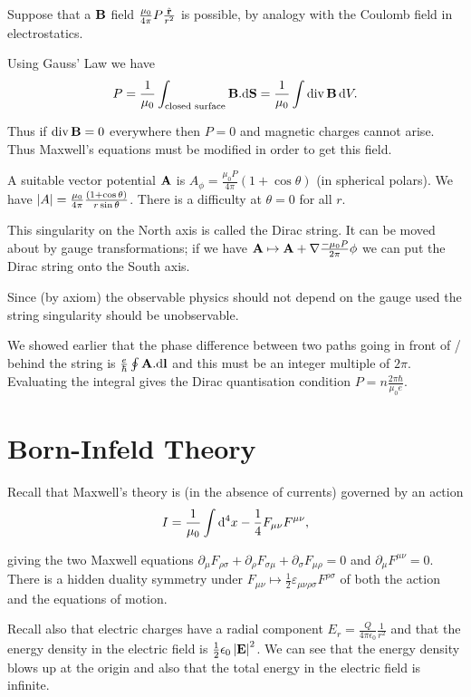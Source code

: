 \documentclass{notes}
\newcommand{\B}{\vect{B}}
\newcommand{\E}{\vect{E}}
\DeclareMathOperator{\dive}{div}
\begin{document}
Suppose that a $\B$ field $\frac{\mu_0}{4 \pi} P
\frac{\Hat{\mathbf{r}}}{r^2}$ is possible, by analogy with the Coulomb
field in electrostatics.

Using Gauss' Law we have
\[
P = \frac{1}{\mu_0} \int_{\text{closed surface}}
\B.\vect{\ud S} = \frac{1}{\mu_0} \int \dive \B\, \ud V.
\]

Thus if $\dive \B = 0$ everywhere then $P = 0$ and magnetic charges
cannot arise.  Thus Maxwell's equations must be modified in order to
get this field.

A suitable vector potential $\mathbf{A}$ is $A_\phi = \frac{\mu_0 P}{4
  \pi} \left( 1 + \cos \theta \right)$ (in spherical polars).  We have
$\left|A\right| = \frac{\mu_0}{4 \pi} \frac{\left(1 + \cos \theta\right)}{r
  \sin \theta}$.  There is a difficulty at $\theta = 0$ for all $r$.

This singularity on the North axis is called the Dirac string.  It can
be moved about by gauge transformations; if we have $\mathbf{A} \mapsto
\mathbf{A} + \nabla \frac{- \mu_0 P}{2 \pi} \phi$ we can put the Dirac
string onto the South axis.

Since (by axiom) the observable physics should not depend on the gauge
used the string singularity should be unobservable.

We showed earlier that the phase difference between two paths going in
front of / behind the string is $\frac{e}{\hbar} \oint
\mathbf{A}.\mathbf{\mathrm{d} l}$ and this must be an integer multiple of $2
\pi$.  Evaluating the integral gives the Dirac quantisation condition
$P = n \frac{2 \pi \hbar}{\mu_0 e}$.

\chapter{Born-Infeld Theory}


Recall that Maxwell's theory is (in the absence of currents) governed
by an action
\[
I = \frac{1}{\mu_0} \int \mathrm{d}^4 x - \frac{1}{4} F_{\mu \nu} F^{\mu \nu},
\]

giving the two Maxwell equations $\partial_\mu F_{\rho \sigma} +
\partial_\rho F_{\sigma \mu} + \partial_\sigma F_{\mu \rho} = 0$ and
$\partial_\mu F^{\mu \nu} = 0$.  There is a hidden duality symmetry
under $F_{\mu \nu} \mapsto \frac{1}{2} \varepsilon_{\mu \nu \rho
  \sigma} F^{\rho \sigma}$ of both the action and the equations of
motion.

Recall also that electric charges have a radial component
$E_r = \frac{Q}{4 \pi \epsilon_0} \frac{1}{r^2}$ and that the energy
density in the electric field is $\frac{1}{2} \epsilon_0 \abs{\E}^2$.
We can see that the energy density blows up at the origin and also that
the total energy in the electric field is infinite.
\end{document}

